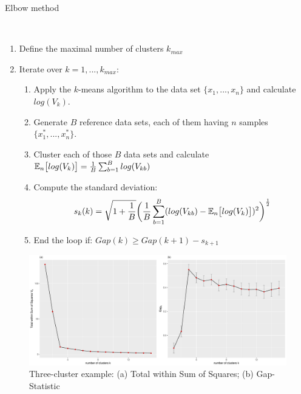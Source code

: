 \begin{algorithm} \label{alg:ellbow}
	\caption{Elbow method \cite{tibshirani2001estimating}}\label{alg:ellbow}
	\begin{algorithmic}
		\\
		\begin{enumerate}
			\item Define the maximal number of clusters $k_{max}$
			\item Iterate over $k = 1, ..., k_{max}$:
			\begin{enumerate}[label=\emph{\alph*})]
				\item \label{lev:ellbow_a} Apply the $k$-means algorithm to the data set $\{x_1, ..., x_n\}$ and calculate $log(V_k)$.
				\item \label{lev:ellbow_b} Generate $B$ reference data sets, each of them having $n$ samples $\{x_1^*, ..., x_n^*\}$.
				\item \label{lev:ellbow_c} Cluster each of those $B$ data sets and calculate $\mathbb{E}_n\big[log(V_k) \big] = \frac{1}{B} \sum_{b=1}^B log(V_{kb})$ 
				\item \label{lev:ellbow_d} Compute the standard deviation: 
					\begin{equation*}
						s_k(k) = \sqrt{1 + \frac{1}{B}} \bigg(\frac{1}{B}\sum_{b=1}^B(log(V_{kb})-\mathbb{E}_n\big[log(V_k) \big])^2\bigg)^\frac{1}{2}
					\end{equation*}
				\item \label{lev:ellbow_e} End the loop if: $Gap(k) \geq Gap(k+1) - s_{k+1}$ 
			\end{enumerate}
		\end{enumerate}
	\end{algorithmic}
\end{algorithm}

\begin{figure}
	\centering
	\includegraphics[width=\textwidth]{figures/chapter_k_means/gap_withinSS}
	\caption{Three-cluster example: (a) Total within Sum of Squares; (b) Gap-Statistic}
	\label{fig:gap_statistics}
\end{figure}

